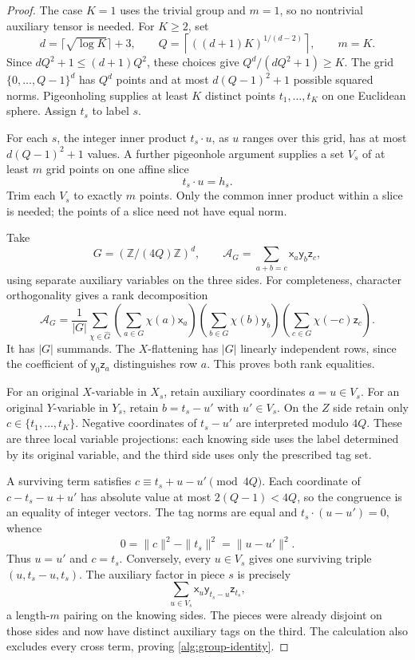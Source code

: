 \documentclass[11pt]{article}
\numberwithin{equation}{section}
\theoremstyle{definition}
\theoremstyle{remark}
\begin{document}
\begin{proof}
The case \(K=1\) uses the trivial group and \(m=1\), so no
nontrivial auxiliary tensor is needed.
For \(K\geq2\), set
\[
 d=\lceil\sqrt{\log K}\rceil+3,
 \qquad
 Q=\left\lceil((d+1)K)^{1/(d-2)}\right\rceil,
 \qquad m=K.
\]
Since \(dQ^2+1\leq(d+1)Q^2\), these choices give
\(Q^d/(dQ^2+1)\geq K\).
The grid \(\{0,\ldots,Q-1\}^d\) has \(Q^d\) points and at most
\(d(Q-1)^2+1\) possible squared norms.  Pigeonholing supplies at least
\(K\) distinct points \(t_1,\ldots,t_K\) on one Euclidean sphere.
Assign \(t_s\) to label \(s\).

For each \(s\), the integer inner product \(t_s\cdot u\), as \(u\)
ranges over this grid, has at most \(d(Q-1)^2+1\) values.  A further
pigeonhole argument supplies a set \(V_s\) of at least \(m\) grid points
on one affine slice
\[
 t_s\cdot u=h_s.
\]
Trim each \(V_s\) to exactly \(m\) points.  Only the common inner product
within a slice is needed; the points of a slice need not have equal norm.

Take
\[
 G=(\mathbb Z/(4Q)\mathbb Z)^d,
 \qquad
 \mathcal A_G=\sum_{a+b=c}\mathsf{x}_a\mathsf{y}_b\mathsf{z}_c,
\]
using separate auxiliary variables on the three sides.  For completeness,
character orthogonality gives a rank decomposition
\[
 \mathcal A_G=\frac1{|G|}\sum_{\chi\in\widehat G}
 \left(\sum_{a\in G}\chi(a)\mathsf{x}_a\right)
 \left(\sum_{b\in G}\chi(b)\mathsf{y}_b\right)
 \left(\sum_{c\in G}\chi(-c)\mathsf{z}_c\right).
\]
It has \(|G|\) summands.  The \(X\)-flattening has \(|G|\) linearly
independent rows, since the coefficient of
\(\mathsf{y}_0\mathsf{z}_a\) distinguishes row
\(a\).  This proves both rank equalities.

For an original \(X\)-variable in \(X_s\), retain auxiliary coordinates
\(a=u\in V_s\).  For an original \(Y\)-variable in \(Y_s\), retain
\(b=t_s-u'\) with \(u'\in V_s\).  On the \(Z\) side retain only
\(c\in\{t_1,\ldots,t_K\}\).  Negative coordinates of \(t_s-u'\)
are interpreted modulo \(4Q\).  These are three local variable
projections: each knowing side uses the label determined by its original
variable, and the third side uses only the prescribed tag set.

A surviving term satisfies
\(c\equiv t_s+u-u'\pmod{4Q}\).
Each coordinate of \(c-t_s-u+u'\) has absolute value at most
\(2(Q-1)<4Q\), so the congruence is an equality of integer vectors.
The tag norms are equal and
\(t_s\cdot(u-u')=0\), whence
\[
 0=\|c\|^2-\|t_s\|^2=\|u-u'\|^2.
\]
Thus \(u=u'\) and \(c=t_s\).  Conversely, every \(u\in V_s\) gives
one surviving triple \((u,t_s-u,t_s)\).
The auxiliary factor in piece \(s\) is precisely
\[
 \sum_{u\in V_s}\mathsf{x}_u\mathsf{y}_{t_s-u}\mathsf{z}_{t_s},
\]
a length-\(m\) pairing on the knowing sides.  The pieces were already
disjoint on those sides and now have distinct auxiliary tags on the third.
The calculation also excludes every cross term, proving
\eqref{alg:group-identity}.


\end{proof}
\end{document}
